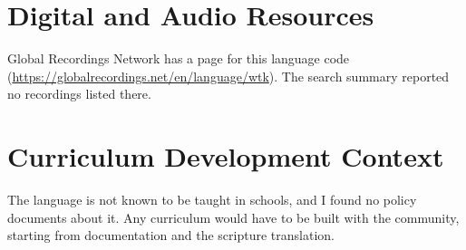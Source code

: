 \documentclass[12pt]{article}
\begin{document}
\section{Digital and Audio Resources}
Global Recordings Network has a page for this language code (\url{https://globalrecordings.net/en/language/wtk}). The search summary reported no recordings listed there.

\section{Curriculum Development Context}
The language is not known to be taught in schools, and I found no policy documents about it. Any curriculum would have to be built with the community, starting from documentation and the scripture translation.
\end{document}
